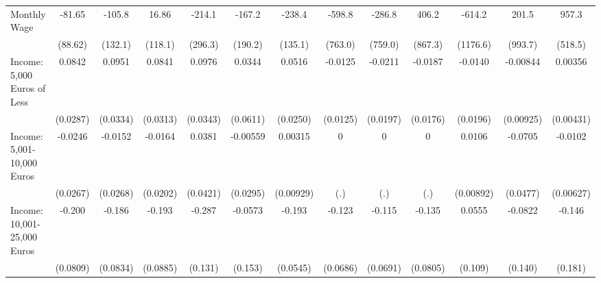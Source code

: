 {\begin{tabular}{l*{12}{c}}
\addlinespace
Monthly Wage&      -81.65         &      -105.8         &       16.86         &      -214.1         &      -167.2         &      -238.4         &      -598.8         &      -286.8         &       406.2         &      -614.2         &       201.5         &       957.3         \\
            &     (88.62)         &     (132.1)         &     (118.1)         &     (296.3)         &     (190.2)         &     (135.1)         &     (763.0)         &     (759.0)         &     (867.3)         &    (1176.6)         &     (993.7)         &     (518.5)         \\
\addlinespace
Income: 5,000 Euros of Less&      0.0842\sym{**} &      0.0951\sym{**} &      0.0841\sym{**} &      0.0976\sym{**} &      0.0344         &      0.0516\sym{*}  &     -0.0125         &     -0.0211         &     -0.0187         &     -0.0140         &    -0.00844         &     0.00356         \\
            &    (0.0287)         &    (0.0334)         &    (0.0313)         &    (0.0343)         &    (0.0611)         &    (0.0250)         &    (0.0125)         &    (0.0197)         &    (0.0176)         &    (0.0196)         &   (0.00925)         &   (0.00431)         \\
\addlinespace
Income: 5,001-10,000 Euros&     -0.0246         &     -0.0152         &     -0.0164         &      0.0381         &    -0.00559         &     0.00315         &           0         &           0         &           0         &      0.0106         &     -0.0705         &     -0.0102         \\
            &    (0.0267)         &    (0.0268)         &    (0.0202)         &    (0.0421)         &    (0.0295)         &   (0.00929)         &         (.)         &         (.)         &         (.)         &   (0.00892)         &    (0.0477)         &   (0.00627)         \\
\addlinespace
Income: 10,001-25,000 Euros&      -0.200\sym{*}  &      -0.186\sym{*}  &      -0.193\sym{*}  &      -0.287\sym{*}  &     -0.0573         &      -0.193\sym{***}&      -0.123         &      -0.115         &      -0.135         &      0.0555         &     -0.0822         &      -0.146         \\
            &    (0.0809)         &    (0.0834)         &    (0.0885)         &     (0.131)         &     (0.153)         &    (0.0545)         &    (0.0686)         &    (0.0691)         &    (0.0805)         &     (0.109)         &     (0.140)         &     (0.181)         \\

\end{tabular}}
